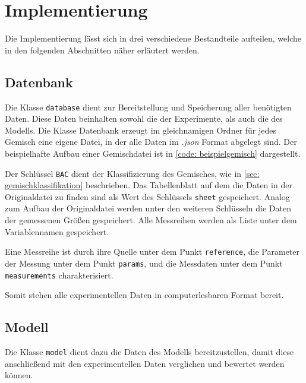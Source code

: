 \documentclass[../thesis.tex]{subfiles}
\begin{document}
\chapter{Implementierung}
\label{chp: implementierung}

Die Implementierung lässt sich in drei verschiedene Bestandteile aufteilen, welche in den folgenden Abschnitten näher erläutert werden.

\section{Datenbank}

Die Klasse \texttt{database} dient zur Bereitstellung und Speicherung aller benötigten Daten. Diese Daten beinhalten sowohl die der Experimente, als auch die des Modells. Die Klasse Datenbank erzeugt im gleichnamigen Ordner für jedes Gemisch eine eigene Datei, in der alle Daten im \textit{.json} Format abgelegt sind. Der beispielhafte Aufbau einer Gemischdatei ist in \autoref{code: beispielgemisch} dargestellt.


\label{code: beispielgemisch}

Der Schlüssel \texttt{BAC} dient der Klassifizierung des Gemisches, wie in \autoref{sec: gemischklassifikation} beschrieben. Das Tabellenblatt auf dem die Daten in der Originaldatei zu finden sind als Wert des Schlüssels \texttt{sheet} gespeichert. Analog zum Aufbau der Originaldatei werden unter den weiteren Schlüsseln die Daten der gemessenen Größen gespeichert. Alle Messreihen werden als Liste unter dem Variablennamen gespeichert.

Eine Messreihe ist durch ihre Quelle unter dem Punkt \texttt{reference}, die Parameter der Messung unter dem Punkt \texttt{params}, und die Messdaten unter dem Punkt \texttt{measurements} charakterisiert.

Somit stehen alle experimentellen Daten in computerlesbaren Format bereit.

\section{Modell}

Die Klasse \texttt{model} dient dazu die Daten des Modells bereitzustellen, damit diese anschließend mit den experimentellen Daten verglichen und bewertet werden können.
\end{document}
